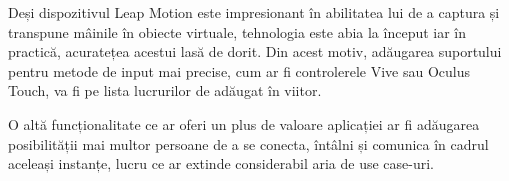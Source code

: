 Deși dispozitivul Leap Motion este impresionant în abilitatea lui de a captura și transpune mâinile în obiecte virtuale, tehnologia este abia la început iar în practică, acuratețea acestui lasă de dorit. Din acest motiv, adăugarea suportului pentru metode de input mai precise, cum ar fi controlerele Vive sau Oculus Touch, va fi pe lista lucrurilor de adăugat în viitor.

O altă funcționalitate ce ar oferi un plus de valoare aplicației ar fi adăugarea posibilității mai multor persoane de a se conecta, întâlni și comunica în cadrul aceleași instanțe, lucru ce ar extinde considerabil aria de use case-uri.